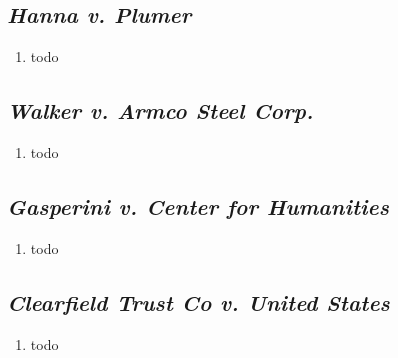 \subsection{\emph{Hanna v. Plumer}}

\begin{enumerate}
    \item todo
\end{enumerate}

\subsection{\emph{Walker v. Armco Steel Corp.}}

\begin{enumerate}
    \item todo
\end{enumerate}

\subsection{\emph{Gasperini v. Center for Humanities}}

\begin{enumerate}
    \item todo
\end{enumerate}

\subsection{\emph{Clearfield Trust Co v. United States}}

\begin{enumerate}
    \item todo
\end{enumerate}
